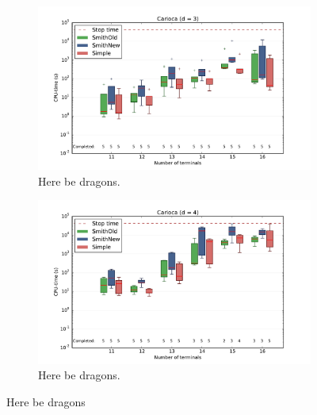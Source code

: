 \begin{figure}[htbp]
  \centering
  \begin{subfigure}[t]{0.5\textwidth}
    \includegraphics[width=\textwidth]{gfx/boxplots/plot_nvst_boxplot_d3_Carioca_1}
  \caption{Here be dragons.\label{fig:boxplot-d3-carioca-1}}
  \end{subfigure}%
  \begin{subfigure}[t]{0.5\textwidth}
    \includegraphics[width=\textwidth]{gfx/boxplots/plot_nvst_boxplot_d4_Carioca_1}
  \caption{Here be dragons.\label{fig:boxplot-d3-carioca-1}}
  \end{subfigure}%
  \caption[Here be dragons]{Here be dragons\label{fig:boxplot-carioca-1}}
\end{figure}

